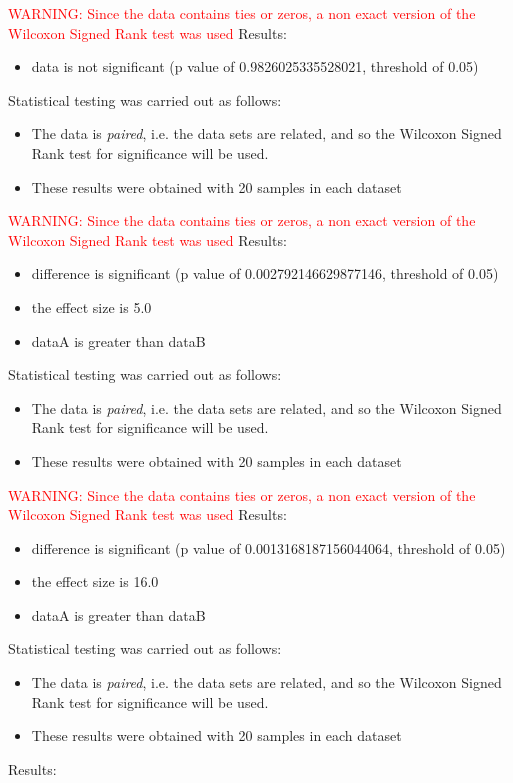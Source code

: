 \documentclass[]{article}
\begin{document}
\textcolor{Red}{WARNING: Since the data contains ties or zeros, a non exact version of the Wilcoxon Signed Rank test was used}
Results:
\begin{itemize}
\item{data is not significant (p value of 0.9826025335528021, threshold of 0.05)}
\end{itemize}Statistical testing was carried out as follows: \begin{itemize}
\item{The data is \textit{paired}, i.e. the data sets are related, and so the Wilcoxon Signed Rank test for significance will be used.}
\item{These results were obtained with 20 samples in each dataset}
\end{itemize}
\textcolor{Red}{WARNING: Since the data contains ties or zeros, a non exact version of the Wilcoxon Signed Rank test was used}
Results:
\begin{itemize}
\item{difference is significant (p value of 0.002792146629877146, threshold of 0.05)}
\item{the effect size is 5.0}
\item{dataA is greater than dataB}
\end{itemize}Statistical testing was carried out as follows: \begin{itemize}
\item{The data is \textit{paired}, i.e. the data sets are related, and so the Wilcoxon Signed Rank test for significance will be used.}
\item{These results were obtained with 20 samples in each dataset}
\end{itemize}
\textcolor{Red}{WARNING: Since the data contains ties or zeros, a non exact version of the Wilcoxon Signed Rank test was used}
Results:
\begin{itemize}
\item{difference is significant (p value of 0.0013168187156044064, threshold of 0.05)}
\item{the effect size is 16.0}
\item{dataA is greater than dataB}
\end{itemize}Statistical testing was carried out as follows: \begin{itemize}
\item{The data is \textit{paired}, i.e. the data sets are related, and so the Wilcoxon Signed Rank test for significance will be used.}
\item{These results were obtained with 20 samples in each dataset}
\end{itemize}Results:
\end{document}
